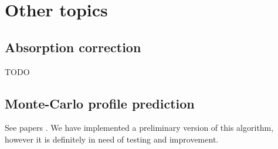 \documentclass[twocolumn,preprintnumbers,amsmath,amssymb]{revtex4}
\begin{document}
\section{Other topics}
\subsection{Absorption correction}
TODO

\subsection{Monte-Carlo profile prediction}
See papers \cite{DuKS14,ScXK15}. We have implemented a preliminary version of this algorithm,
however it is definitely in need of testing and improvement.



\end{document}
